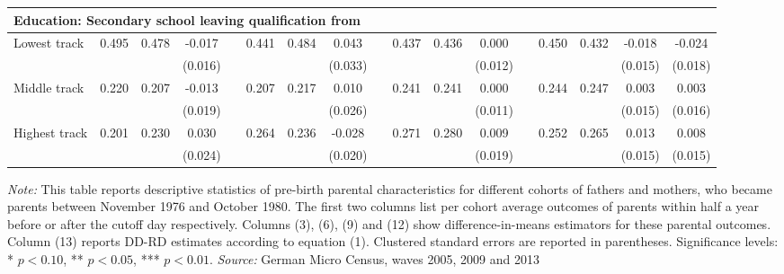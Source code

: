 \begin{center}
\begin{adjustwidth}{3cm}{}
{\begin{tabular}{l*{16}{c}}
\\
\multicolumn{12}{l}{\textbf{Education: Secondary school leaving qualification from}}\\
\hline
Lowest track & 0.495 & 0.478 & -0.017 &		& 0.441 & 0.484 & 0.043 & 		& 0.437 & 0.436 & 0.000 &		& 0.450 & 0.432 & -0.018 & -0.024 \\
& & & (0.016) 				& & & & (0.033)			& & & & (0.012)			& & & & (0.015) & (0.018) \\
Middle track & 0.220 & 0.207 & -0.013 &		& 0.207 & 0.217 & 0.010 & 		& 0.241 & 0.241 & 0.000 &		& 0.244 & 0.247 & 0.003 & 0.003 \\
& & & (0.019) 				& & & & (0.026)			& & & & (0.011)			& & & & (0.015) & (0.016) \\
Highest track & 0.201 & 0.230 & 0.030 &		& 0.264 & 0.236 & -0.028 & 		& 0.271 & 0.280 & 0.009 &		& 0.252 & 0.265 & 0.013 & 0.008 \\
& & & (0.024) 				& & & & (0.020)			& & & & (0.019)			& & & & (0.015) & (0.015) \\

\bottomrule
\end{tabular}
}
\begin{minipage}{0.76\colwidth} %
{\footnotesize \textit{Note:} This table reports descriptive statistics of pre-birth parental characteristics for different cohorts of fathers and mothers, who became parents between November 1976 and October 1980. The first two columns list per cohort average outcomes of parents within half a year before or after the cutoff day respectively. Columns (3), (6), (9) and (12) show difference-in-means estimators for these parental outcomes. Column (13) reports DD-RD estimates according to equation (1). 
Clustered standard errors are reported in parentheses. Significance levels: * \(p<0.10\), ** \(p<0.05\), *** \(p<0.01\). \newline \textit{Source: }German Micro Census, waves 2005, 2009 and 2013\par}
\end{minipage}
\end{adjustwidth}
\end{center}
